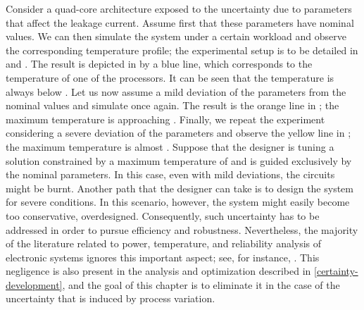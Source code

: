Consider a quad-core architecture exposed to the uncertainty due to parameters
that affect the leakage current. Assume first that these parameters have nominal
values. We can then simulate the system under a certain workload and observe the
corresponding temperature profile; the experimental setup is to be detailed in
 and . The
result is depicted in  by a blue line, which corresponds to
the temperature of one of the processors. It can be seen that the temperature is
always below . Let us now assume a mild deviation of the parameters
from the nominal values and simulate once again. The result is the orange line
in ; the maximum temperature is approaching .
Finally, we repeat the experiment considering a severe deviation of the
parameters and observe the yellow line in ; the maximum
temperature is almost . Suppose that the designer is tuning a
solution constrained by a maximum temperature of  and is guided
exclusively by the nominal parameters. In this case, even with mild deviations,
the circuits might be burnt. Another path that the designer can take is to
design the system for severe conditions. In this scenario, however, the system
might easily become too conservative, overdesigned. Consequently, such
uncertainty has to be addressed in order to pursue efficiency and robustness.
Nevertheless, the majority of the literature related to power, temperature, and
reliability analysis of electronic systems ignores this important aspect; see,
for instance, \cite{rao2009, rai2011, thiele2011}. This negligence is also
present in the analysis and optimization described in
\cref{certainty-development}, and the goal of this chapter is to eliminate it in
the case of the uncertainty that is induced by process variation.
